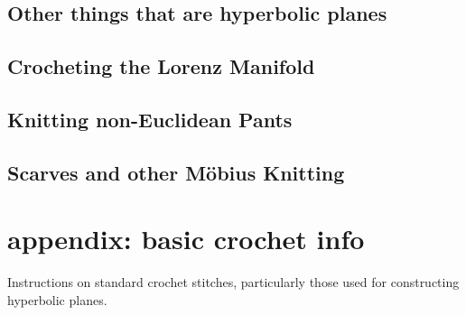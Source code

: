 \documentclass[letterpaper,titlepage]{article}
\begin{document}
\subsection{Other things that are hyperbolic planes\cite{adventures}}
\subsection{Crocheting the Lorenz Manifold \cite{crochetlorenz}}
\subsection{Knitting non-Euclidean Pants \cite{makingmath}}
\subsection{Scarves and other M\"obius Knitting \cite{magicalknitting}\cite{magicalknitting2}}

\section{appendix: basic crochet info}
Instructions on standard crochet stitches, particularly those used for constructing hyperbolic planes. \cite{happyhooker}

\newpage


\end{document}
